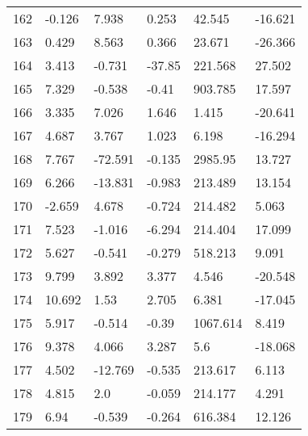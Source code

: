\documentclass[11pt]{article}
\begin{document}
\begin{center}
\begin{longtable}{llllll}
        162 & -0.126     & 7.938                  & 0.253             & 42.545             & -16.621  \\
        163 & 0.429      & 8.563                  & 0.366             & 23.671             & -26.366  \\
        164 & 3.413      & -0.731                 & -37.85            & 221.568            & 27.502   \\
        165 & 7.329      & -0.538                 & -0.41             & 903.785            & 17.597   \\
        166 & 3.335      & 7.026                  & 1.646             & 1.415              & -20.641  \\
        167 & 4.687      & 3.767                  & 1.023             & 6.198              & -16.294  \\
        168 & 7.767      & -72.591                & -0.135            & 2985.95            & 13.727   \\
        169 & 6.266      & -13.831                & -0.983            & 213.489            & 13.154   \\
        170 & -2.659     & 4.678                  & -0.724            & 214.482            & 5.063    \\
        171 & 7.523      & -1.016                 & -6.294            & 214.404            & 17.099   \\
        172 & 5.627      & -0.541                 & -0.279            & 518.213            & 9.091    \\
        173 & 9.799      & 3.892                  & 3.377             & 4.546              & -20.548  \\
        174 & 10.692     & 1.53                   & 2.705             & 6.381              & -17.045  \\
        175 & 5.917      & -0.514                 & -0.39             & 1067.614           & 8.419    \\
        176 & 9.378      & 4.066                  & 3.287             & 5.6                & -18.068  \\
        177 & 4.502      & -12.769                & -0.535            & 213.617            & 6.113    \\
        178 & 4.815      & 2.0                    & -0.059            & 214.177            & 4.291    \\
        179 & 6.94       & -0.539                 & -0.264            & 616.384            & 12.126   \\

\end{longtable}
\end{center}
\end{document}
